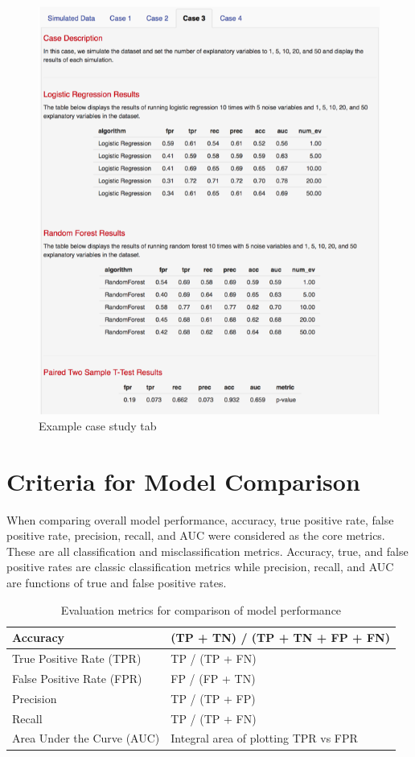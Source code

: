 \documentclass{llncs}
\begin{document}
\begin{figure}
\centering
\includegraphics[scale=0.99]{center.png}
\caption{Example case study tab}
\label{fig:center}
\end{figure}


\section{Criteria for Model Comparison}
\noindent 
When comparing overall model performance, accuracy, true positive rate, false positive rate, precision, recall, and AUC were considered as the core metrics.  These are all classification and misclassification metrics.  Accuracy, true, and false positive rates are classic classification metrics while precision, recall, and AUC are functions of true and false positive rates.

\begin{table}[]
\begin{tabular}{|l|l|}
\hline
Accuracy                   & (TP + TN) / (TP + TN + FP + FN)      \\ \hline
True Positive Rate (TPR)   & TP / (TP + FN)                       \\ \hline
False Positive Rate (FPR)  & FP / (FP + TN)                       \\ \hline
Precision                  & TP / (TP + FP)                       \\ \hline
Recall                     & TP / (TP + FN)                       \\ \hline
Area Under the Curve (AUC) & Integral area of plotting TPR vs FPR \\ \hline
\end{tabular}
\caption{Evaluation metrics for comparison of model performance}
\label{eval_metrics}
\end{table}
\end{document}
